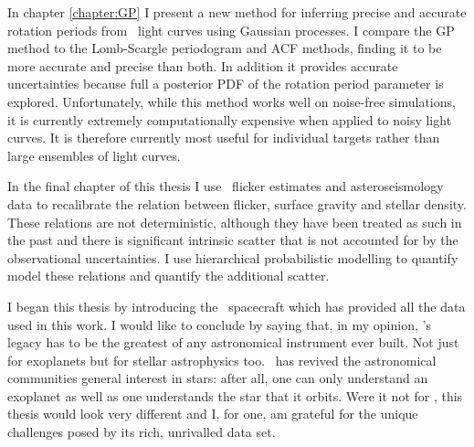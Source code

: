 In chapter \ref{chapter:GP} I present a new method for inferring precise and
accurate rotation periods from \kepler\ light curves using Gaussian processes.
I compare the GP method to the Lomb-Scargle periodogram and ACF methods,
finding it to be more accurate and precise than both.
In addition it provides accurate uncertainties because full a posterior PDF of
the rotation period parameter is explored.
Unfortunately, while this method works well on noise-free simulations, it is
currently extremely computationally expensive when applied to noisy light
curves.
It is therefore currently most useful for individual targets rather than large
ensembles of light curves.

In the final chapter of this thesis I use \kepler\ flicker estimates and
asteroseismology data to recalibrate the relation between flicker, surface
gravity and stellar density.
These relations are not deterministic, although they have been treated as such
in the past and there is significant intrinsic scatter that is not accounted
for by the observational uncertainties.
I use hierarchical probabilistic modelling to quantify  model these relations
and quantify the additional scatter.

I began this thesis by introducing the \kepler\ spacecraft which has provided
all the data used in this work.
I would like to conclude by saying that, in my opinion, \kepler's legacy has
to be the greatest of any astronomical instrument ever built.
Not just for exoplanets but for stellar astrophysics too.
\kepler\ has revived the astronomical communities general interest in stars:
after all, one can only understand an exoplanet as well as one understands the
star that it orbits.
Were it not for \kepler, this thesis would look very different and I, for one,
am grateful for the unique challenges posed by its rich, unrivalled data set.
